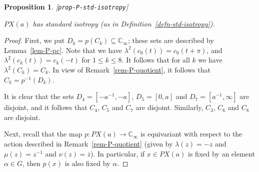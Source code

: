 \documentclass[reqno]{amsart}
\newcommand{\lbl}[1]{\label{#1}\textup{[\texttt{#1}]}\par}
\newcommand{\lbl}{\label}
\newcommand{\al}        {\alpha}
\newcommand{\lm}        {\lambda}
\newcommand{\C}         {{\mathbb{C}}}
\newcommand{\ov}[1]     {\overline{#1}}
\newcommand{\sse}       {\subseteq}
\renewcommand{\:}{\colon}
\newtheorem{proposition}[theorem]{Proposition}
\theoremstyle{definition}
\begin{document}
\begin{proposition}\lbl{prop-P-std-isotropy}
 $PX(a)$ has standard isotropy (as in
 Definition~\ref{defn-std-isotropy}).
\end{proposition}
\begin{proof}
 First, we put $D_k=p(C_k)\sse\C_\infty$; these sets are described by
 Lemma~\ref{lem-P-pc}.  Note that we have
 $\lm^2(c_0(t))=c_0(t+\pi)$, and $\lm^2(c_k(t))=c_k(-t)$ for $1\leq
 k\leq 8$.  It follows that for all $k$ we have $\lm^2(C_k)=C_k$.  In
 view of Remark~\ref{rem-P-quotient}, it follows that
 $C_k=p^{-1}(D_k)$.

 It is clear that the sets $D_4=[-a^{-1},-a]$, $D_5=[0,a]$ and
 $D_7=[a^{-1},\infty]$ are disjoint, and it follows that $C_4$, $C_5$
 and $C_7$ are disjoint.  Similarly, $C_3$, $C_6$ and $C_8$ are
 disjoint.

 Next, recall that the map $p\:PX(a)\to\C_\infty$ is equivariant with
 respect to the action described in Remark~\ref{rem-P-quotient}
 (given by $\lm(z)=-z$ and $\mu(z)=z^{-1}$ and $\nu(z)=\ov{z}$).  In
 particular, if $x\in PX(a)$ is fixed by an element $\al\in G$, then
 $p(x)$ is also fixed by $\al$.


\end{proof}
\end{document}

